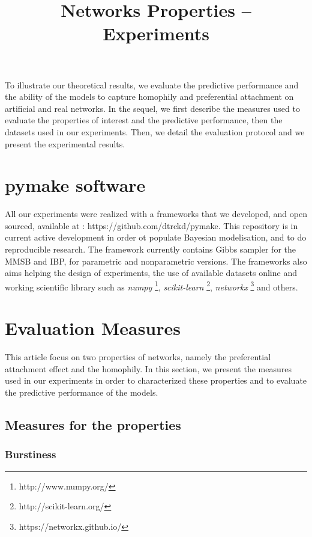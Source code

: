 \documentclass[a4paper, 12pt]{article}
\title{Networks Properties -- Experiments}
\begin{document}
\maketitle
\tableofcontents

To illustrate our theoretical results, we evaluate the predictive performance and the ability of the models to capture homophily and preferential attachment on artificial and real networks. In the sequel, we first describe the measures used to evaluate the properties of interest and the predictive performance, then the datasets used in our experiments. Then, we detail the evaluation protocol and we present the experimental results.

\section{pymake software}
All our experiments were realized with a frameworks that we developed, and open sourced, available at : https://github.com/dtrckd/pymake. This repository is in current active development in order ot populate Bayesian modelisation, and to do reproducible research. The framework currently contains Gibbs sampler for the MMSB and IBP, for parametric and nonparametric versions. The frameworks also aims helping the design of experiments, the use of available datasets online and working scientific library such as \emph{numpy} \footnote{http://www.numpy.org/}, \emph{scikit-learn} \footnote{http://scikit-learn.org/}, \emph{networkx} \footnote{https://networkx.github.io/} and others.

\section{Evaluation Measures}
This article focus on two properties of networks, namely the preferential attachment effect and the homophily. In this section, we present the measures used in our experiments in order to characterized these properties and to evaluate the predictive performance of the models.

\subsection{Measures for the properties}

\subsubsection{Burstiness}
\label{sec:experiments-burst}
\end{document}
